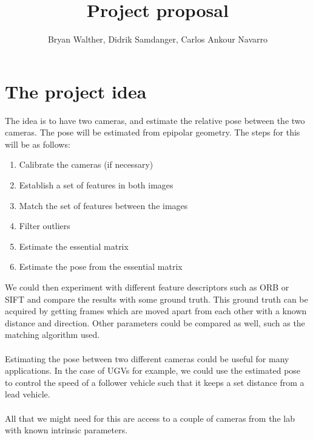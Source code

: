 \documentclass[12pt]{article}
\title{Project proposal}
\author{Bryan Walther, Didrik Samdanger, Carlos Ankour Navarro}
\begin{document}
\maketitle
\section*{The project idea}
The idea is to have two cameras, and estimate the relative pose between the two cameras.
The pose will be estimated from epipolar geometry. The steps for this will be as follows:
\begin{enumerate}
    \item Calibrate the cameras (if necessary)
    \item Establish a set of features in both images
    \item Match the set of features between the images
    \item Filter outliers
    \item Estimate the essential matrix
    \item Estimate the pose from the essential matrix
\end{enumerate}

We could then experiment with different feature descriptors such as ORB or SIFT and compare the results with some ground truth.
This ground truth can be acquired by getting frames which are moved apart from each other with a known distance and direction.
Other parameters could be compared as well, such as the matching algorithm used.
\\ \\
Estimating the pose between two different cameras could be useful for many applications. 
In the case of UGVs for example, we could use the estimated pose to control the speed of a follower vehicle such that it keeps a set distance from a lead vehicle.
\\ \\
All that we might need for this are access to a couple of cameras from the lab with known intrinsic parameters.
\end{document}
